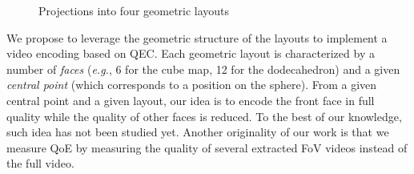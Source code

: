 \begin{figure}[t]
\centering
{}
\caption{Projections into four geometric layouts}\label{fig:mapping}
\end{figure}

We propose to leverage the geometric
structure of the layouts to implement a video encoding based on
\ac{QEC}. Each geometric layout is characterized by a number of
\emph{faces} (\textit{e.g.}, 6 for the cube map, 12 for the
dodecahedron) and a given \emph{central point} (which corresponds to a
position on the sphere).
From a given central point and a given layout, our idea is to encode
the front face in full quality while the quality of other faces is
reduced.
To the best of our knowledge, such idea has not been studied yet.
Another originality of our work is that we measure \ac{QoE} by
measuring the quality of several extracted \ac{FoV} videos instead of
the full video.

